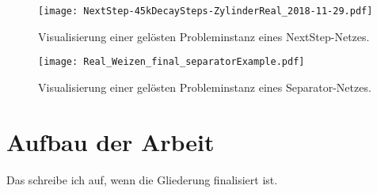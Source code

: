 \begin{figure}[h]
    \centering
    \texttt{[image: NextStep-45kDecaySteps-ZylinderReal\_2018-11-29.pdf]}
    \caption{Visualisierung einer gelösten Probleminstanz eines NextStep-Netzes.}
    \label{fig:visualsNextstep}
\end{figure}


\begin{figure}[h]
    \centering
	\texttt{[image: Real\_Weizen\_final\_separatorExample.pdf]}
	\caption{Visualisierung einer gelösten Probleminstanz eines Separator-Netzes.}
	\label{fig:visualsSeparator}
\end{figure}



\section{Aufbau der Arbeit}

Das schreibe ich auf, wenn die Gliederung finalisiert ist.


